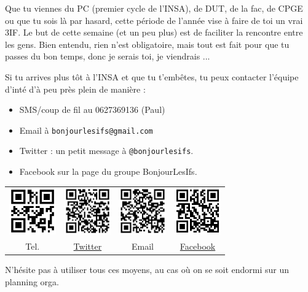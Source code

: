 Que tu viennes du PC (premier cycle de l'INSA), de DUT, de la fac, de CPGE ou que tu sois là par hasard, cette période de l'année vise à faire de toi un vrai 3IF. Le but de cette semaine (et un peu plus) est de faciliter la rencontre entre les gens. Bien entendu, rien n'est obligatoire, mais tout est fait pour que tu passes du bon temps, donc je serais toi, je viendrais ...

Si tu arrives plus tôt à l'INSA et que tu t'embêtes, tu peux contacter l'équipe d'inté d'à peu près plein de manière :
\begin{itemize}
      \item SMS/coup de fil au 0627369136 (Paul)
      \item Email à \texttt{bonjourlesifs@gmail.com}
      \item Twitter : un petit message à \texttt{@bonjourlesifs}.
      \item Facebook sur la page du groupe BonjourLesIfs.
\end{itemize}

\vspace{0.5cm}

{
    \hspace{-2cm}
\begin{tabular}{cccc}
	\includegraphics[height=2cm]{images/telPaulQRcode.png} & \includegraphics[height=2cm]{images/qrcodeBjrLesIfsTwitter.png} & \includegraphics[height=2cm]{images/qrcodeEmail.png} & \includegraphics[height=2cm]{images/qrcodeFacebook.png} \\
	Tel. & \href{http://twitter.com/bonjourlesifs}{Twitter} & Email &
	\href{http://www.facebook.com/group.php?gid=120929821278518}{Facebook}\\
\end{tabular}
}

\vspace{0.5cm}
N'hésite pas à utiliser tous ces moyens, au cas où on se soit endormi sur un planning orga. 
